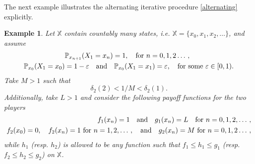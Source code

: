 \documentclass[11pt,reqno]{article}
\numberwithin{equation}{section}
\newtheorem{example}{Example}[section]
\renewcommand{\P}{\mathbb{P}}
\newcommand{\X}{\mathbb{X}}
\newcommand{\eps}{\varepsilon}
\begin{document}
The next example illustrates the alternating iterative procedure \eqref{alternating} explicitly.

\begin{example}\label{eg1}
Let $\X$ contain countably many states, i.e. $\mathbb{X}=\{x_0,x_1, x_2, \dotso\}$, and assume
\begin{equation}\label{transition}
\begin{split}
&\P_{x_{n+1}}(X_1=x_n)=1,\quad \hbox{for}\ n=0,1,2\dotso,\\
\P_{x_0}(X_1=x_0)&=1-\eps\quad\text{and}\quad\P_{x_0}(X_1=x_1)=\eps,\quad \hbox{for some}\ \eps\in[0,1).
\end{split}
\end{equation}
Take $M>1$ such that 
\begin{equation}\label{delta_2}
\delta_2(2)<1/M< \delta_2(1).
\end{equation}
Additionally, take $L>1$ and consider the following payoff functions for the two players
\begin{align}
f_1(x_n)= 1\quad\text{and}\quad g_1(x_n)= L\quad \hbox{for}\ n=0,1,2,\dotso,\label{p1} \\
f_2(x_0)=0,\quad f_2(x_n)=1\ \hbox{for}\ n=1,2,\dotso,\quad\text{and}\quad g_2(x_n)=M\ \hbox{for}\ n=0,1,2\dotso,\label{p2}
\end{align}
while $h_1$ (resp. $h_2$) is allowed to be any function such that $f_1\le h_1\le g_1$ (resp. $f_2\le h_2\le g_2$) on $\X$. 


\end{example}
\end{document}
